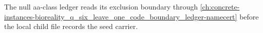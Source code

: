 The null aa-class ledger reads its exclusion boundary through \autoref{ch:concrete-instances-bioreality_q_six_leave_one_code_boundary_ledger-namecert} before the local child file records the seed carrier.

